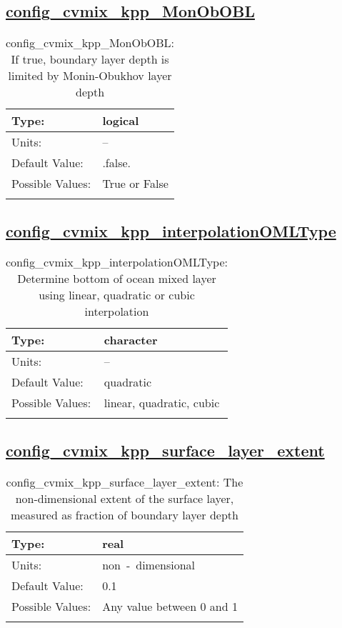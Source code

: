 \subsection[config\_cvmix\_kpp\_MonObOBL]{\hyperref[sec:nm_tab_cvmix]{config\_cvmix\_kpp\_MonObOBL}}
\label{subsec:nm_sec_config_cvmix_kpp_MonObOBL}
\begin{center}
\begin{longtable}{| p{2.0in} || p{4.0in} |}
    \hline
    Type: & logical \\
    \hline
    Units: & -- \\
    \hline
    Default Value: & .false. \\
    \hline
    Possible Values: & True or False \\
    \hline
    \caption{config\_cvmix\_kpp\_MonObOBL: If true, boundary layer depth is limited by Monin-Obukhov layer depth}
\end{longtable}
\end{center}
\subsection[config\_cvmix\_kpp\_interpolationOMLType]{\hyperref[sec:nm_tab_cvmix]{config\_cvmix\_kpp\_interpolationOMLType}}
\label{subsec:nm_sec_config_cvmix_kpp_interpolationOMLType}
\begin{center}
\begin{longtable}{| p{2.0in} || p{4.0in} |}
    \hline
    Type: & character \\
    \hline
    Units: & -- \\
    \hline
    Default Value: & quadratic \\
    \hline
    Possible Values: & linear, quadratic, cubic \\
    \hline
    \caption{config\_cvmix\_kpp\_interpolationOMLType: Determine bottom of ocean mixed layer using linear, quadratic or cubic interpolation}
\end{longtable}
\end{center}
\subsection[config\_cvmix\_kpp\_surface\_layer\_extent]{\hyperref[sec:nm_tab_cvmix]{config\_cvmix\_kpp\_surface\_layer\_extent}}
\label{subsec:nm_sec_config_cvmix_kpp_surface_layer_extent}
\begin{center}
\begin{longtable}{| p{2.0in} || p{4.0in} |}
    \hline
    Type: & real \\
    \hline
    Units: & \si{non-dimensional} \\
    \hline
    Default Value: & 0.1 \\
    \hline
    Possible Values: & Any value between 0 and 1 \\
    \hline
    \caption{config\_cvmix\_kpp\_surface\_layer\_extent: The non-dimensional extent of the surface layer, measured as fraction of boundary layer depth}
\end{longtable}
\end{center}
